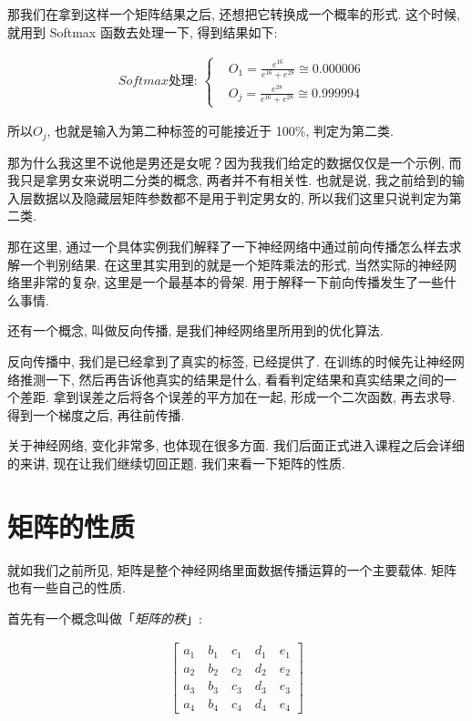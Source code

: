 那我们在拿到这样一个矩阵结果之后, 还想把它转换成一个概率的形式. 这个时候, 就用到 Softmax 函数去处理一下, 得到结果如下: 

\begin{align*}
  & Softmax \mbox{处理: } \begin{cases}
  & O_1 = \frac{e^{16}}{e^{16} + e^{28}} \cong 0.000006 \\ & O_j = \frac{e^{28}}{e^{16} + e^{28}} \cong 0.999994
  \end{cases}
\end{align*}

所以$O_j$, 也就是输入为第二种标签的可能接近于 100\%,  判定为第二类. 

那为什么我这里不说他是男还是女呢？因为我我们给定的数据仅仅是一个示例, 而我只是拿男女来说明二分类的概念, 两者并不有相关性. 也就是说, 我之前给到的输入层数据以及隐藏层矩阵参数都不是用于判定男女的, 所以我们这里只说判定为第二类. 

那在这里, 通过一个具体实例我们解释了一下神经网络中通过前向传播怎么样去求解一个判别结果. 在这里其实用到的就是一个矩阵乘法的形式, 当然实际的神经网络里非常的复杂, 这里是一个最基本的骨架. 用于解释一下前向传播发生了一些什么事情. 

还有一个概念, 叫做反向传播, 是我们神经网络里所用到的优化算法. 

反向传播中, 我们是已经拿到了真实的标签, 已经提供了. 在训练的时候先让神经网络推测一下, 然后再告诉他真实的结果是什么, 看看判定结果和真实结果之间的一个差距. 拿到误差之后将各个误差的平方加在一起, 形成一个二次函数, 再去求导. 得到一个梯度之后, 再往前传播. 

关于神经网络, 变化非常多, 也体现在很多方面. 我们后面正式进入课程之后会详细的来讲, 现在让我们继续切回正题. 我们来看一下矩阵的性质. 

\section{矩阵的性质}

就如我们之前所见, 矩阵是整个神经网络里面数据传播运算的一个主要载体. 矩阵也有一些自己的性质. 

首先有一个概念叫做「\textit{矩阵的秩}」: 

\begin{align*}
  \begin{bmatrix}
  a_1 \quad b_1 \quad c_1 \quad d_1 \quad e_1 \\
  a_2 \quad b_2 \quad c_2 \quad d_2 \quad e_2 \\
  a_3 \quad b_3 \quad c_3 \quad d_3 \quad e_3 \\
  a_4 \quad b_4 \quad c_4 \quad d_4 \quad e_4 
  \end{bmatrix}
\end{align*}

